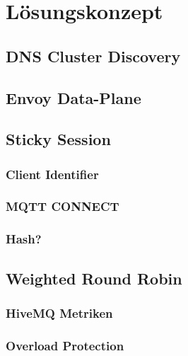 \section{Lösungskonzept}

\subsection{DNS Cluster Discovery}


\subsection{Envoy Data-Plane}

\subsection{Sticky Session}
\subsubsection{Client Identifier}
\subsubsection{MQTT CONNECT}

\subsubsection{Hash?}

\subsection{Weighted Round Robin}
\subsubsection{HiveMQ Metriken}
\subsubsection{Overload Protection}
